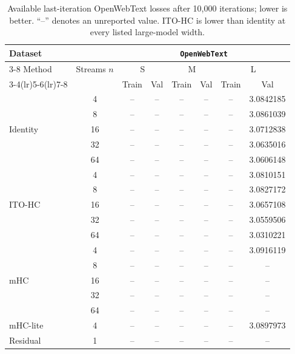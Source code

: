 \documentclass{article}
\begin{document}
\begin{table}[t]
\caption{Available last-iteration OpenWebText losses after 10,000 iterations; lower is better. ``--'' denotes an unreported value. ITO-HC is lower than identity at every listed large-model width.}
\label{tab:experiments}
\begin{center}
{\setlength{\tabcolsep}{2pt}
\renewcommand{\arraystretch}{0.68}
\scriptsize
\begin{tabular}{l c cc cc cc}
\toprule
Dataset & & \multicolumn{6}{c}{\texttt{OpenWebText}}\\
\cmidrule(lr){3-8}
Method & Streams $n$ & \multicolumn{2}{c}{\textsf{S}} & \multicolumn{2}{c}{\textsf{M}} & \multicolumn{2}{c}{\textsf{L}}\\
\cmidrule(lr){3-4}\cmidrule(lr){5-6}\cmidrule(lr){7-8}
& & Train & Val & Train & Val & Train & Val\\
\midrule
\multirow{5}{*}{Identity}
 & 4  & -- & -- & -- & -- & -- & 3.0842185\\
 & 8  & -- & -- & -- & -- & -- & 3.0861039\\
 & 16 & -- & -- & -- & -- & -- & 3.0712838\\
 & 32 & -- & -- & -- & -- & -- & 3.0635016\\
 & 64 & -- & -- & -- & -- & -- & 3.0606148\\
\midrule
\multirow{5}{*}{ITO-HC}
 & 4  & -- & -- & -- & -- & -- & 3.0810151\\
 & 8  & -- & -- & -- & -- & -- & 3.0827172\\
 & 16 & -- & -- & -- & -- & -- & 3.0657108\\
 & 32 & -- & -- & -- & -- & -- & 3.0559506\\
 & 64 & -- & -- & -- & -- & -- & 3.0310221\\
\midrule
\multirow{5}{*}{mHC}
 & 4  & -- & -- & -- & -- & -- & 3.0916119\\
 & 8  & -- & -- & -- & -- & -- & --\\
 & 16 & -- & -- & -- & -- & -- & --\\
 & 32 & -- & -- & -- & -- & -- & --\\
 & 64 & -- & -- & -- & -- & -- & --\\
\midrule
mHC-lite & 4 & -- & -- & -- & -- & -- & 3.0897973\\
Residual & 1 & -- & -- & -- & -- & -- & --\\
\bottomrule
\end{tabular}}
\end{center}
\end{table}
\end{document}
